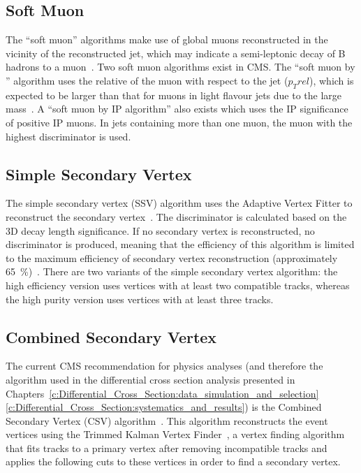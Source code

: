 \subsection{Soft Muon}
\label{ss:soft_muon}
The ``soft muon'' algorithms make use of global muons reconstructed in the vicinity of the reconstructed jet,
which may indicate a semi-leptonic decay of B hadrons to a muon~\cite{CMS-AN-2009-085}. Two soft muon
algorithms exist in CMS. The ``soft muon by \pt'' algorithm uses the relative \pt of the muon with respect to
the jet ($p_{T}{rel}$), which is expected to be larger than that for muons in light flavour jets due to the
large \bquark mass~\cite{CMS-AN-2009-085, Ferro:2012tg}. A ``soft muon by IP algorithm'' also exists which
uses the IP significance of positive IP muons. In jets containing more than one muon, the muon with the
highest discriminator is used.

\subsection{Simple Secondary Vertex}
\label{ss:simple_secondary_vertex}
The simple secondary vertex (SSV) algorithm uses the Adaptive Vertex Fitter to reconstruct the secondary
vertex~\cite{0954-3899-34-12-N01}. The discriminator is calculated based on the 3D decay length significance.
If no secondary vertex is reconstructed, no discriminator is produced, meaning that the efficiency of this
algorithm is limited to the maximum efficiency of secondary vertex reconstruction (approximately
65~\%)~\cite{Chatrchyan:2012jua}. There are two variants of the simple secondary vertex algorithm: the high
efficiency version uses vertices with at least two compatible tracks, whereas the high purity version uses
vertices with at least three tracks.

\subsection{Combined Secondary Vertex}
\label{ss:combined_secondary_vertex}
The current CMS recommendation for physics analyses (and therefore the algorithm used in the differential
cross section analysis presented in
Chapters~\ref{c:Differential_Cross_Section:data_simulation_and_selection}\textendash\ref{c:Differential_Cross_Section:systematics_and_results})
is the Combined Secondary Vertex (CSV) algorithm~\cite{Weiser:2006md}. This algorithm reconstructs the event
vertices using the Trimmed Kalman Vertex Finder~\cite{Speer:927395}, a vertex finding algorithm that fits
tracks to a primary vertex after removing incompatible tracks and applies the following cuts to these vertices
in order to find a secondary vertex.

